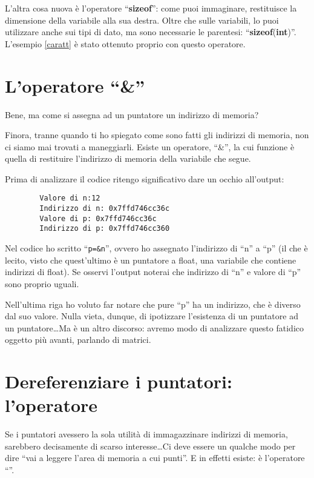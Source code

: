 	L'altra cosa nuova è l'operatore ``\textbf{sizeof}'': come puoi immaginare, restituisce la dimensione della variabile alla sua destra. Oltre che sulle variabili, lo puoi utilizzare anche sui tipi di dato, ma sono necessarie le parentesi: ``\textbf{sizeof}(\textbf{int})''. L'esempio \ref{caratt} è stato ottenuto proprio con questo operatore.
	
	\section{L'operatore ``\&''}
	Bene, ma come si assegna ad un puntatore un indirizzo di memoria? 
	
	Finora, tranne quando ti ho spiegato come sono fatti gli indirizzi di memoria, non ci siamo mai trovati a maneggiarli. Esiste un operatore, ``\&'', la cui funzione è quella di restituire l'indirizzo di memoria della variabile che segue. 
	
	\label{pt1}
	Prima di analizzare il codice ritengo significativo dare un occhio all'output:
	\begin{shaded}
	\begin{verbatim}
		Valore di n:12 				
		Indirizzo di n:	0x7ffd746cc36c
		Valore di p: 0x7ffd746cc36c     
		Indirizzo di p:	0x7ffd746cc360
	\end{verbatim}
	\end{shaded}
	Nel codice ho scritto ``\verb|p=&n|'', ovvero ho assegnato l'indirizzo di ``n'' a ``p'' (il che è lecito, visto che quest'ultimo è un puntatore a float, una variabile che contiene indirizzi di float). Se osservi l'output noterai che indirizzo di ``n'' e valore di ``p'' sono proprio uguali. 
	
	Nell'ultima riga ho voluto far notare che pure ``p'' ha un indirizzo, che è diverso dal suo valore. Nulla vieta, dunque, di ipotizzare l'esistenza di un puntatore ad un puntatore\ldots Ma è un altro discorso: avremo modo di analizzare questo fatidico oggetto più avanti, parlando di matrici.
	
	\section{Dereferenziare i puntatori: l'operatore \textasteriskcentered}
	Se i puntatori avessero la sola utilità di immagazzinare indirizzi di memoria, sarebbero decisamente di scarso interesse\ldots Ci deve essere un qualche modo per dire ``vai a leggere l'area di memoria a cui punti''. E in effetti esiste: è l'operatore ``\textasteriskcentered''.
	
